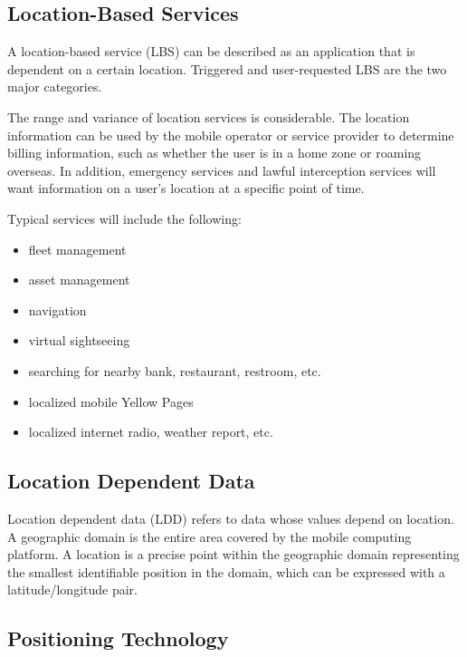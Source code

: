 \documentclass[12pt,a4paper,titlepage]{article}
\begin{document}
\subsection{Location-Based Services} %
\label{sub:location_based_services}
A location-based service (LBS) can be described as an application that is dependent on a certain location. Triggered and user-requested LBS are the two major categories. \cite{DRoza:2003wz}

The range and variance of location services is considerable. The location information can be used by the mobile operator or service provider to determine billing information, such as whether the user is in a home zone or roaming overseas. In addition, emergency services and lawful interception services will want information on a user's location at a specific point of time. \cite{Adams:2003un}

Typical services will include the following:

\begin{itemize}
	\item fleet management
	\item asset management
	\item navigation
	\item virtual sightseeing
	\item searching for nearby bank, restaurant, restroom, etc.
	\item localized mobile Yellow Pages
	\item localized internet radio, weather report, etc.
\end{itemize}

\subsection{Location Dependent Data} %
\label{sub:location_dependent_data}
Location dependent data (LDD) refers to data whose values depend on location. A geographic domain is the entire area covered by the mobile computing platform. A location is a precise point within the geographic domain representing the smallest identifiable position in the domain, which can be expressed with a latitude/longitude pair.\cite{Dunham:1998ci}

\subsection{Positioning Technology} %
\label{sub:positioning_technology}
\end{document}
